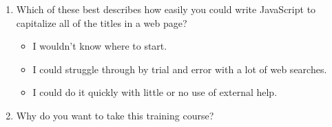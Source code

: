 \begin{enumerate}
\item
  Which of these best describes how easily you could write JavaScript
  to capitalize all of the titles in a web page?
  \begin{itemize}
  \item
    I wouldn't know where to start.
  \item
    I could struggle through by trial and error with a lot of web searches.
  \item
    I could do it quickly with little or no use of external help.
  \end{itemize}

\item
  Why do you want to take this training course?

\end{enumerate}
